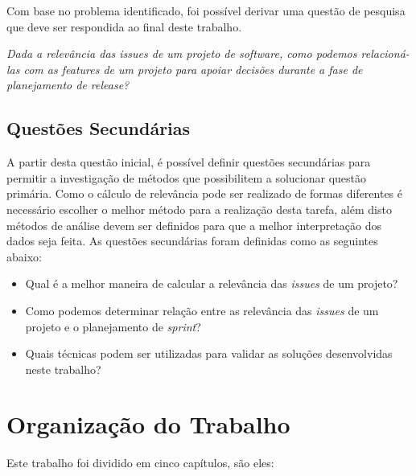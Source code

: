 Com base no problema identificado, foi possível derivar uma questão de pesquisa que deve ser respondida ao final deste trabalho.

\begin{center}
    \textit{Dada a relevância das \textit{issues} de um projeto de software, como podemos relacioná-las com as \textit{features} de um projeto para apoiar decisões durante a fase de planejamento de \textit{release}?}
\end{center}

\subsection{Questões Secundárias}
\label{int:que:sec}

A partir desta questão inicial, é possível definir questões secundárias para permitir a investigação de métodos que possibilitem a solucionar questão primária. Como o cálculo de relevância pode ser realizado de formas diferentes é necessário escolher o melhor método para a realização desta tarefa, além disto métodos de análise devem ser definidos para que a melhor interpretação dos dados seja feita. As questões secundárias foram definidas como as seguintes abaixo:

\begin{itemize}
    \item Qual é a melhor maneira de calcular a relevância das \textit{issues} de um projeto?
    \item Como podemos determinar relação entre as relevância das \textit{issues} de um projeto e o planejamento de \textit{sprint}?
    \item Quais técnicas podem ser utilizadas para validar as soluções desenvolvidas neste trabalho?
\end{itemize}


\section{Organização do Trabalho}
\label{int:org}
Este trabalho foi dividido em cinco capítulos, são eles:

